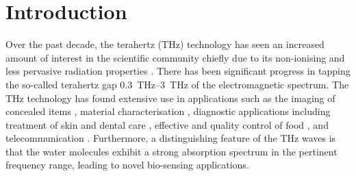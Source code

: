 \documentclass[preprints,article,accept,moreauthors,pdftex]{Definitions/mdpi}
\renewcommand{\^}{\hat}  %
\begin{document}


\section{Introduction}
\label{intro}
Over the past decade, the terahertz (THz) technology has seen an increased amount of interest in the scientific community chiefly due to its non-ionising and less pervasive radiation properties \cite{Afsharinejad2017}. There has been significant progress in tapping the so-called terahertz gap \SIrange{.3}{3}{\tera \hertz} of the electromagnetic spectrum. The THz technology has found extensive use in applications such as the imaging of concealed items \cite{Federici2005}, material characterisation \cite{Afsharinejad2017}, diagnostic applications including treatment of skin and dental care \cite{ruth2002,Res2004}, effective and quality control of food \cite{Sun2017}, and telecommunication \cite{Afsharinejad2017,Naftaly2007,Kurner2014}. Furthermore, a distinguishing feature of the THz waves is that the water molecules exhibit a strong absorption spectrum in the pertinent frequency range, leading to novel bio-sensing applications.
\end{document}
